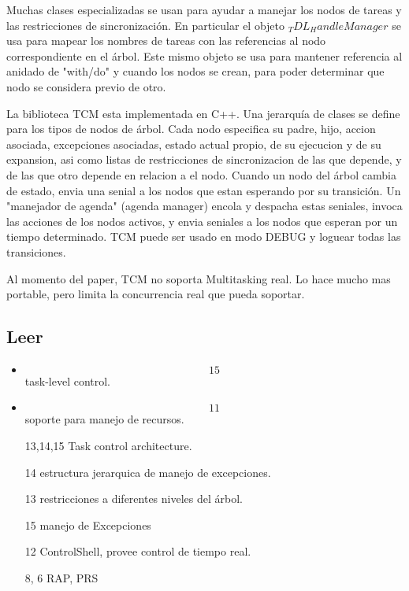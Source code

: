 \documentclass[a4paper, 11pt, oneside]{article}
\begin{document}
Muchas clases especializadas se usan para ayudar a manejar los nodos
de tareas y las restricciones de sincronización. En particular
el objeto $_TDL_HandleManager$ se usa para mapear los nombres de tareas con
las referencias al nodo correspondiente en el árbol.
Este mismo objeto se usa para mantener referencia al anidado de "with/do" y
cuando los nodos se crean, para poder determinar que nodo se
considera previo de otro.

La biblioteca TCM esta implementada en C++. Una jerarquía de clases se
define para los tipos de nodos de árbol.
Cada nodo especifica su padre, hijo, accion asociada, excepciones asociadas,
estado actual propio, de su ejecucion y de su expansion, asi como listas de
restricciones de sincronizacion de las que depende, y de las que otro 
depende en relacion a el nodo.
Cuando un nodo del árbol cambia de estado, envia una senial a los nodos
que estan esperando por su transición.
Un "manejador de agenda" (agenda manager) encola y despacha estas seniales,
invoca las acciones de los nodos activos, y envia seniales a los nodos
que esperan por un tiempo determinado.
TCM puede ser usado en modo DEBUG y loguear todas las transiciones.

Al momento del paper, TCM no soporta Multitasking real. 
Lo hace mucho mas portable, pero limita la concurrencia real que pueda
soportar.


\subsection{Leer}

\begin{itemize}
\item \[15\] task-level control.
\item \[11\] soporte para manejo de recursos.
\item [13,14,15] Task control architecture.
\item [14] estructura jerarquica de manejo de excepciones.
\item [13] restricciones a diferentes niveles del árbol.
\item [15] manejo de Excepciones
\item [12] ControlShell, provee control de tiempo real.
\item [8, 6] RAP, PRS
\end{itemize}
\end{document}
